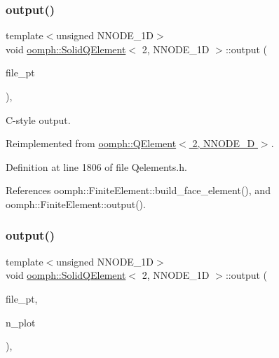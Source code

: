 \subsubsection{\texorpdfstring{output()}{output()}\hspace{0.1cm}{\footnotesize\ttfamily [3/4]}}
{\footnotesize\ttfamily template$<$unsigned N\+N\+O\+D\+E\+\_\+1D$>$ \\
void \hyperlink{classoomph_1_1SolidQElement}{oomph\+::\+Solid\+Q\+Element}$<$ 2, N\+N\+O\+D\+E\+\_\+1D $>$\+::output (\begin{DoxyParamCaption}\item[{F\+I\+LE $\ast$}]{file\+\_\+pt }\end{DoxyParamCaption})\hspace{0.3cm}{\ttfamily [inline]}, {\ttfamily [virtual]}}



C-\/style output. 



Reimplemented from \hyperlink{classoomph_1_1QElement_3_012_00_01NNODE__1D_01_4_a08e9ce84ba8787b25935f18c00996a5d}{oomph\+::\+Q\+Element$<$ 2, N\+N\+O\+D\+E\+\_\+D $>$}.



Definition at line 1806 of file Qelements.\+h.



References oomph\+::\+Finite\+Element\+::build\+\_\+face\+\_\+element(), and oomph\+::\+Finite\+Element\+::output().

\mbox{\label{classoomph_1_1SolidQElement_3_012_00_01NNODE__1D_01_4_a600c5d98f117ac64a07b95a75d06cf03}} 
\subsubsection{\texorpdfstring{output()}{output()}\hspace{0.1cm}{\footnotesize\ttfamily [4/4]}}
{\footnotesize\ttfamily template$<$unsigned N\+N\+O\+D\+E\+\_\+1D$>$ \\
void \hyperlink{classoomph_1_1SolidQElement}{oomph\+::\+Solid\+Q\+Element}$<$ 2, N\+N\+O\+D\+E\+\_\+1D $>$\+::output (\begin{DoxyParamCaption}\item[{F\+I\+LE $\ast$}]{file\+\_\+pt,  }\item[{const unsigned \&}]{n\+\_\+plot }\end{DoxyParamCaption})\hspace{0.3cm}{\ttfamily [inline]}, {\ttfamily [virtual]}}




